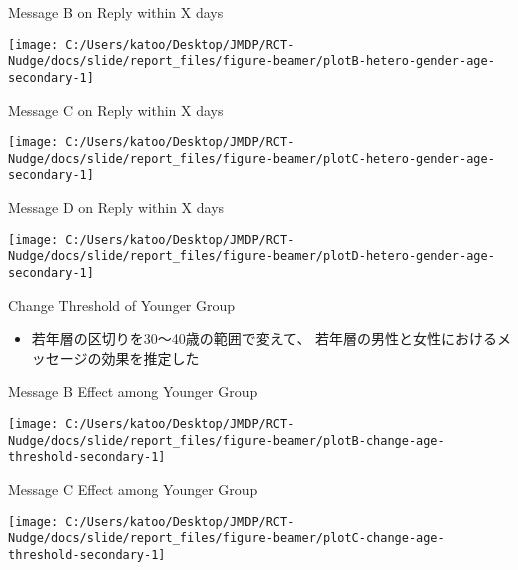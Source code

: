 \documentclass[
      aspectratio=169,
        12pt,
    ]{beamer}
\providecommand{\tightlist}{%
  \setlength{\itemsep}{0pt}\setlength{\parskip}{0pt}}
\begin{document}
\begin{frame}{Message B on Reply within X days}
\protect\hypertarget{message-b-on-reply-within-x-days}{}
\begin{center}\texttt{[image: C:/Users/katoo/Desktop/JMDP/RCT-Nudge/docs/slide/report\_files/figure-beamer/plotB-hetero-gender-age-secondary-1]} \end{center}
\end{frame}

\begin{frame}{Message C on Reply within X days}
\protect\hypertarget{message-c-on-reply-within-x-days}{}
\begin{center}\texttt{[image: C:/Users/katoo/Desktop/JMDP/RCT-Nudge/docs/slide/report\_files/figure-beamer/plotC-hetero-gender-age-secondary-1]} \end{center}
\end{frame}

\begin{frame}{Message D on Reply within X days}
\protect\hypertarget{message-d-on-reply-within-x-days}{}
\begin{center}\texttt{[image: C:/Users/katoo/Desktop/JMDP/RCT-Nudge/docs/slide/report\_files/figure-beamer/plotD-hetero-gender-age-secondary-1]} \end{center}
\end{frame}

\begin{frame}{Change Threshold of Younger Group}
\protect\hypertarget{change-threshold-of-younger-group-1}{}
\begin{itemize}
\tightlist
\item
  若年層の区切りを30～40歳の範囲で変えて、
  若年層の男性と女性におけるメッセージの効果を推定した
\end{itemize}
\end{frame}

\begin{frame}{Message B Effect among Younger Group}
\protect\hypertarget{message-b-effect-among-younger-group-1}{}
\begin{center}\texttt{[image: C:/Users/katoo/Desktop/JMDP/RCT-Nudge/docs/slide/report\_files/figure-beamer/plotB-change-age-threshold-secondary-1]} \end{center}
\end{frame}

\begin{frame}{Message C Effect among Younger Group}
\protect\hypertarget{message-c-effect-among-younger-group-1}{}
\begin{center}\texttt{[image: C:/Users/katoo/Desktop/JMDP/RCT-Nudge/docs/slide/report\_files/figure-beamer/plotC-change-age-threshold-secondary-1]} \end{center}
\end{frame}
\end{document}
